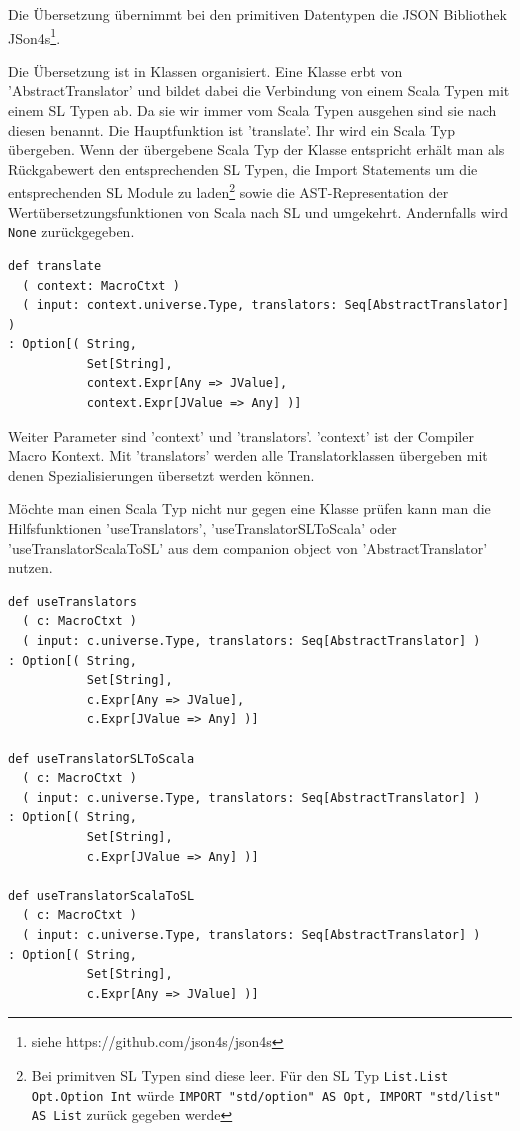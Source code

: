 \documentclass[12pt]{scrreprt}
\begin{document}
Die Übersetzung übernimmt bei den primitiven Datentypen die JSON Bibliothek JSon4s\footnote{siehe https://github.com/json4s/json4s}.


Die Übersetzung ist in Klassen organisiert. Eine Klasse erbt von 'AbstractTranslator' und bildet dabei die Verbindung von einem Scala Typen mit einem \ac{SL} Typen ab. Da sie wir immer vom Scala Typen ausgehen sind sie nach diesen benannt. Die Hauptfunktion ist 'translate'. Ihr wird ein Scala Typ übergeben. Wenn der übergebene Scala Typ der Klasse entspricht erhält man als Rückgabewert den entsprechenden \ac{SL} Typen, die Import Statements um die entsprechenden \ac{SL} Module zu laden\footnote{Bei primitven \ac{SL} Typen sind diese leer. Für den \ac{SL} Typ \lstinline!List.List Opt.Option Int! würde \lstinline!IMPORT "std/option" AS Opt, IMPORT "std/list" AS List! zurück gegeben werde} sowie die \ac{AST}-Representation der Wertübersetzungsfunktionen von Scala nach \ac{SL} und umgekehrt. Andernfalls wird \lstinline!None! zurückgegeben.

\begin{lstlisting}[caption=Hauptfunktion in AbstractTranslator, label=lst:bsp2]
def translate
  ( context: MacroCtxt )
  ( input: context.universe.Type, translators: Seq[AbstractTranslator] )
: Option[( String, 
           Set[String], 
           context.Expr[Any => JValue], 
           context.Expr[JValue => Any] )]
\end{lstlisting}

Weiter Parameter sind 'context' und 'translators'. 'context' ist der Compiler Macro Kontext. Mit 'translators' werden alle Translatorklassen übergeben mit denen Spezialisierungen übersetzt werden können.

Möchte man einen Scala Typ nicht nur gegen eine Klasse prüfen kann man die Hilfsfunktionen 'useTranslators', 'useTranslatorSLToScala' oder 'useTranslatorScalaToSL' aus dem companion object von 'AbstractTranslator' nutzen.


\begin{lstlisting}[caption=Hilfsfunktionen, label=lst:hilfsfunktionen]
def useTranslators
  ( c: MacroCtxt )
  ( input: c.universe.Type, translators: Seq[AbstractTranslator] )
: Option[( String,
           Set[String], 
           c.Expr[Any => JValue], 
           c.Expr[JValue => Any] )]

def useTranslatorSLToScala
  ( c: MacroCtxt )
  ( input: c.universe.Type, translators: Seq[AbstractTranslator] )
: Option[( String, 
           Set[String], 
           c.Expr[JValue => Any] )]

def useTranslatorScalaToSL
  ( c: MacroCtxt )
  ( input: c.universe.Type, translators: Seq[AbstractTranslator] )
: Option[( String, 
           Set[String], 
           c.Expr[Any => JValue] )]
\end{lstlisting}
\end{document}

